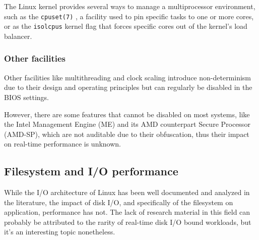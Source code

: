 \documentclass[a4paper,12pt]{report}
\begin{document}
The Linux kernel provides several ways to manage a multiprocessor environment, such as the \texttt{cpuset(7)} \cite{man-cpuset-7}, a facility used to pin specific tasks to one or more cores, or as the \texttt{isolcpus} kernel flag that forces specific cores out of the kernel's load balancer. 

\subsubsection{Other facilities}

Other facilities like multithreading and clock scaling introduce non-determinism due to their design and operating principles but can regularly be disabled in the BIOS settings.

However, there are some features that cannot be disabled on most systems, like the Intel Management Engine (ME) and its AMD counterpart Secure Processor (AMD-SP), which are not auditable due to their obfuscation, thus their impact on real-time performance is unknown.

\subsection{Filesystem and I/O performance}

While the I/O architecture of Linux has been well documented and analyzed in the literature, the impact of disk I/O, and specifically of the filesystem on application, performance has not. The lack of research material in this field can probably be attributed to the rarity of real-time disk I/O bound workloads, but it's an interesting topic nonetheless.

\printbibliography[nottype=online,title={Bibliography}]
\printbibliography[type=online,title={Sitography}]
\end{document}
